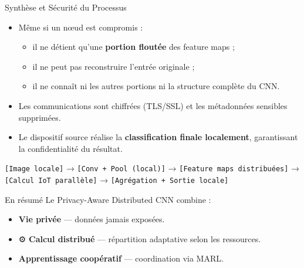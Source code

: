 \documentclass{beamer}
\begin{document}
\begin{frame}{Synthèse et Sécurité du Processus}
\begin{itemize}
    \item Même si un nœud est compromis :
    \begin{itemize}
        \item il ne détient qu’une \textbf{portion floutée} des feature maps ;
        \item il ne peut pas reconstruire l’entrée originale ;
        \item il ne connaît ni les autres portions ni la structure complète du CNN.
    \end{itemize}
    \item Les communications sont chiffrées (TLS/SSL) et les métadonnées sensibles supprimées.
    \item Le dispositif source réalise la \textbf{classification finale localement}, garantissant la confidentialité du résultat.
\end{itemize}

\vspace{0.3cm}
\begin{center}
\scriptsize
\texttt{[Image locale]} → \texttt{[Conv + Pool (local)]} → \texttt{[Feature maps distribuées]} → \texttt{[Calcul IoT parallèle]} → \texttt{[Agrégation + Sortie locale]}
\end{center}

\vspace{0.2cm}
\begin{block}{En résumé}
Le Privacy-Aware Distributed CNN combine :
\begin{itemize}
    \item  \textbf{Vie privée} — données jamais exposées.
    \item ⚙️ \textbf{Calcul distribué} — répartition adaptative selon les ressources.
    \item  \textbf{Apprentissage coopératif} — coordination via MARL.
\end{itemize}
\end{block}
\end{frame}
\end{document}
